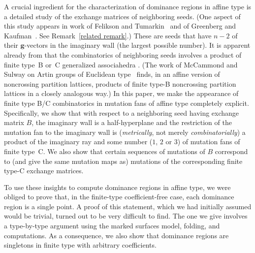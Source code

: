 \documentclass{amsart}
\theoremstyle{definition}
\theoremstyle{remark}
\numberwithin{equation}{section}
\newcommand{\0}{{\mathbf{0}}}
\newcommand{\g}{\mathbf{g}}
\begin{document}
A crucial ingredient for the characterization of dominance regions in affine type is a detailed study of the exchange matrices of neighboring seeds.  
(One aspect of this study appears in work of Felikson and Tumarkin~\cite{FeTuCoeff} and of Greenberg and Kaufman~\cite{GreenbergKaufman}.
See Remark~\ref{related remark}.)
These are seeds that have $n-2$ of their $\g$-vectors in the imaginary wall (the largest possible number).
It is apparent already from \cite{affdenom} that the combinatorics of neighboring seeds involves a product of finite type~B or~C generalized associahedra \cite[Propositions~5.13, 6,13]{affdenom}.  
(The work of McCammond and Sulway on Artin groups of Euclidean type~\cite{McSul} finds, in an affine version of noncrossing partition lattices, products of finite type-B noncrossing partition lattices in a closely analogous way.)
In this paper, we make the appearance of finite type B/C combinatorics in mutation fans of affine type completely explicit.
Specifically, we show that with respect to a neighboring seed having exchange matrix $B$, the imaginary wall is a half-hyperplane and the restriction of the mutation fan to the imaginary wall is (\emph{metrically}, not merely \emph{combinatorially}) a product of the imaginary ray and some number ($1$, $2$ or $3$) of mutation fans of finite type~C.
We also show that certain sequences of mutations of $B$ correspond to (and give the same mutation maps as) mutations of the corresponding finite type-C exchange matrices.

To use these insights to compute dominance regions in affine type, we were obliged to prove that, in the finite-type coefficient-free case, each dominance region is a single point.
A proof of this statement, which we had initially assumed would be trivial, turned out to be very difficult to find.
The one we give involves a type-by-type argument using the marked surfaces model, folding, and computations.
As a consequence, we also show that dominance regions are singletons in finite type with arbitrary coefficients.
\end{document}
